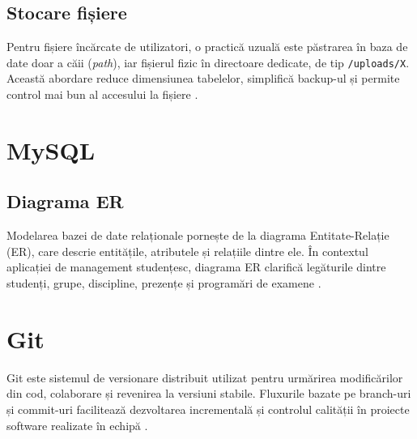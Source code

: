 \subsection{Stocare fișiere}
Pentru fișiere încărcate de utilizatori, o practică uzuală este păstrarea în baza de date doar a căii (\textit{path}), iar fișierul fizic în directoare dedicate, de tip \texttt{/uploads/X}. Această abordare reduce dimensiunea tabelelor, simplifică backup-ul și permite control mai bun al accesului la fișiere \cite{php_group_2024}.

\section{MySQL}

\subsection{Diagrama ER}
Modelarea bazei de date relaționale pornește de la diagrama Entitate-Relație (ER), care descrie entitățile, atributele și relațiile dintre ele. În contextul aplicației de management studențesc, diagrama ER clarifică legăturile dintre studenți, grupe, discipline, prezențe și programări de examene \cite{wikipedia_er_2026,oracle_mysql_2024}.

\section{Git}

Git este sistemul de versionare distribuit utilizat pentru urmărirea modificărilor din cod, colaborare și revenirea la versiuni stabile. Fluxurile bazate pe branch-uri și commit-uri facilitează dezvoltarea incrementală și controlul calității în proiecte software realizate în echipă \cite{git_doc_2026}.
